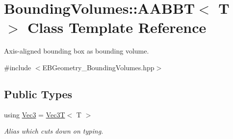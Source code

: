 \hypertarget{classBoundingVolumes_1_1AABBT}{}\section{Bounding\+Volumes\+:\+:A\+A\+B\+BT$<$ T $>$ Class Template Reference}
\label{classBoundingVolumes_1_1AABBT}


Axis-\/aligned bounding box as bounding volume.  




{\ttfamily \#include $<$E\+B\+Geometry\+\_\+\+Bounding\+Volumes.\+hpp$>$}

\subsection*{Public Types}
\begin{DoxyCompactItemize}
\item 
\mbox{\label{classBoundingVolumes_1_1AABBT_aa968c6b21a7f02e1cbfc03d26c7e67b4}} 
using \hyperlink{classBoundingVolumes_1_1AABBT_aa968c6b21a7f02e1cbfc03d26c7e67b4}{Vec3} = \hyperlink{classVec3T}{Vec3T}$<$ T $>$
\begin{DoxyCompactList}\small\item\em Alias which cuts down on typing. \end{DoxyCompactList}\end{DoxyCompactItemize}
